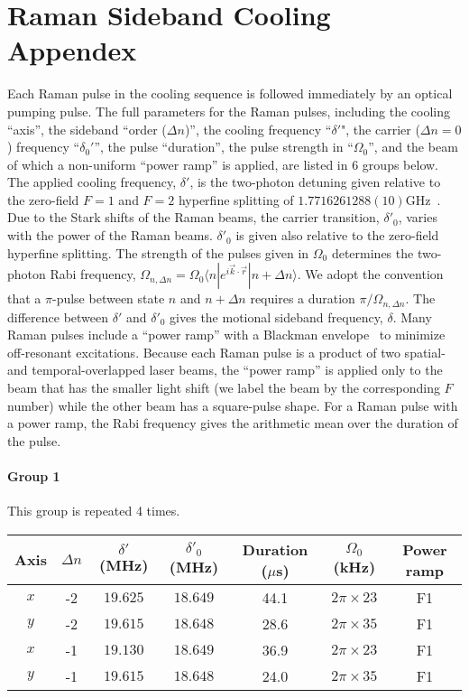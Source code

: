 
\chapter{Raman Sideband Cooling Appendex}
\label{appendex:rsc}

Each Raman pulse in the cooling sequence is followed immediately by an optical pumping pulse.
The full parameters for the Raman pulses, including the cooling ``axis'',
the sideband ``order ($\Delta n$)'', the cooling frequency ``$\delta '$",
the carrier ($\Delta n=0$) frequency ``$\delta_0'$'', the pulse ``duration'',
the pulse strength in ``$\Omega_0$'',
and the beam of which a non-uniform ``power ramp'' is applied, are listed in 6 groups below.
The applied cooling frequency, $\delta'$,
is the two-photon detuning given relative to the zero-field $F=1$ and $F=2$ hyperfine splitting
of $1.7716261288(10)$GHz~\cite{steck_sodium_nodate}.
Due to the Stark shifts of the Raman beams, the carrier transition, $\delta'_0$,
varies with the power of the Raman beams.
$\delta'_0$ is given also relative to the zero-field hyperfine splitting.
The strength of the pulses given in $\Omega_0$ determines the two-photon Rabi frequency,
$\Omega_{n,\Delta n}=\Omega_0 \langle n|e^{i \vec{k} \cdot \vec{r}}|n+\Delta n\rangle$.
We adopt the convention that a $\pi$-pulse between state $n$ and $n+\Delta n$ requires a duration $\pi/\Omega_{n,\Delta n}$.
The difference between $\delta'$ and $\delta'_0$ gives the motional sideband frequency, $\delta$.
Many Raman pulses include a ``power ramp'' with a Blackman envelope~\cite{kasevich_laser_1992} to minimize off-resonant excitations.
Because each Raman pulse is a product of two spatial- and temporal-overlapped laser beams,
the ``power ramp'' is applied only to the beam that has the smaller light shift
(we label the beam by the corresponding $F$ number) while the other beam has a square-pulse shape.
For a Raman pulse with a power ramp,
the Rabi frequency gives the arithmetic mean over the duration of the pulse.

\newpage

\subsubsection{Group 1}
This group is repeated 4 times.
\begin{center}
  \begin{tabular}{|c|c|c|c|c|c|c|}
    \hline
    Axis&$\Delta n$&$\delta'$ (MHz)&$\delta'_0$ (MHz)&Duration ($\mu$s)& $\Omega_0$ (kHz)&Power ramp\\\hline
    $x$&-2&$19.625$&$18.649$&44.1&$2\pi\times23$&F1\\\hline
    $y$&-2&$19.615$&$18.648$&28.6&$2\pi\times35$&F1\\\hline
    $x$&-1&$19.130$&$18.649$&36.9&$2\pi\times23$&F1\\\hline
    $y$&-1&$19.615$&$18.648$&24.0&$2\pi\times35$&F1\\\hline
  \end{tabular}
\end{center}

